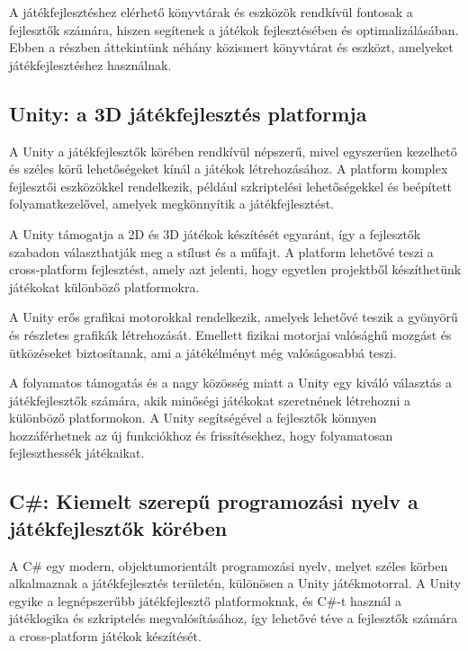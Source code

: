  A játékfejlesztéshez elérhető könyvtárak és eszközök rendkívül fontosak a fejlesztők számára, hiszen segítenek a játékok fejlesztésében és optimalizálásában. Ebben a részben áttekintünk néhány közismert könyvtárat és eszközt, amelyeket játékfejlesztéshez használnak.

\bigskip

\subsection{Unity: a 3D játékfejlesztés platformja}

A Unity\cite{unity-docs, unity-web} a játékfejlesztők körében rendkívül népszerű, mivel egyszerűen kezelhető és széles körű lehetőségeket kínál a játékok létrehozásához. A platform komplex fejlesztői eszközökkel rendelkezik, például szkriptelési lehetőségekkel és beépített folyamatkezelővel, amelyek megkönnyítik a játékfejlesztést. 

A Unity támogatja a 2D és 3D játékok készítését egyaránt, így a fejlesztők szabadon választhatják meg a stílust és a műfajt. A platform lehetővé teszi a cross-platform fejlesztést, amely azt jelenti, hogy egyetlen projektből készíthetünk játékokat különböző platformokra.

A Unity erős grafikai motorokkal rendelkezik, amelyek lehetővé teszik a gyönyörű és részletes grafikák létrehozását. Emellett fizikai motorjai valósághű mozgást és ütközéseket biztosítanak, ami a játékélményt még valóságosabbá teszi.

A folyamatos támogatás és a nagy közösség miatt a Unity egy kiváló választás a játékfejlesztők számára, akik minőségi játékokat szeretnének létrehozni a különböző platformokon. A Unity segítségével a fejlesztők könnyen hozzáférhetnek az új funkciókhoz és frissítésekhez, hogy folyamatosan fejleszthessék játékaikat.

\subsection{C\#: Kiemelt szerepű programozási nyelv a játékfejlesztők körében}

 A C\# \cite{csharp-doc} egy modern, objektumorientált programozási nyelv, melyet széles körben alkalmaznak a játékfejlesztés területén, különösen a Unity játékmotorral\cite{unity-cs}. A Unity egyike a legnépszerűbb játékfejlesztő platformoknak, és C\#-t használ a játéklogika és szkriptelés megvalósításához, így lehetővé téve a fejlesztők számára a cross-platform játékok készítését.

